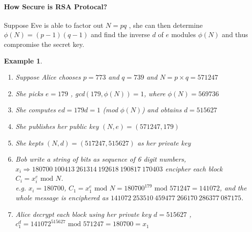 \documentclass[]{book}
\newtheorem*{example}{Example}
\theoremstyle{nonumberplain}
\begin{document}
\paragraph{How Secure is RSA Protocal?}
Suppose Eve is able to factor out $N=pq$ , she can then determine $\phi(N) = (p-1)(q-1)$ and find the inverse $d$ of $e$ modules  $\phi(N)$ and thus compromise the secret key.

\begin{example}
\noindent
    \begin{enumerate}
        \item Suppose Alice chooses $p=773$ and $q=739$ and $N=p\times q=571247$
        \item She picks $e=179$ , gcd$(179, \phi(N))=1$, where $\phi(N) = 569736$
        \item She computes $ed=179d=1$ (mod $\phi(N)$) and obtains $d=515627$
        \item She publishes her public key $(N,e)=(571247, 179)$
        \item She kepts $(N,d) = (517247, 515627)$ as her private key
        \item Bob write a string of bits as sequence of 6 digit numbers, \\
        $x_{i} \Rightarrow 180700 \ 100413 \ 261314 \ 192618 \ 190817 \ 170403$ encipher each block $C_{i} = x_{i}^{e} \text{ mod } N$. \\
        e.g. $x_{i} = 180700$, $C_{1} = x_{1}^{e} \text{ mod } N = 180700^{179} \text{ mod } 571247 = 141072$, and the whole message is enciphered as $141072 \ 253510 \ 459477 \ 266170 \ 286377 \ 087175$.
        \item Alice decrypt each block using her private key $d=515627$ , $c_1^d = 141072^{515627} \text{ mod }571247=180700=x_1$
    \end{enumerate}
\end{example}
\end{document}
